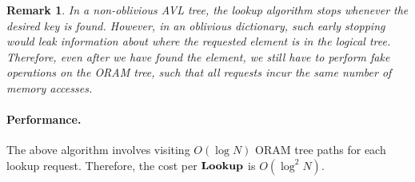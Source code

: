 \documentclass[11pt]{article}
\newtheorem{remark}{Remark}
\begin{document}
\begin{remark}
In a non-oblivious AVL tree, the lookup algorithm 
stops whenever the desired key is found.
However, in an oblivious dictionary, such early stopping
would leak information 
about where the 
requested element
is in the logical tree. 
Therefore, even after we have found
the element, we still have to perform fake
operations on the ORAM tree, such that all requests 
incur the same number of memory accesses.
\label{rmk:padfake}
\end{remark}

\paragraph{Performance.}
The above algorithm involves visiting
$O(\log N)$ ORAM tree paths for each lookup request. 
Therefore, the cost per ${\bf Lookup}$ is $O(\log^2 N)$.





\end{document}
